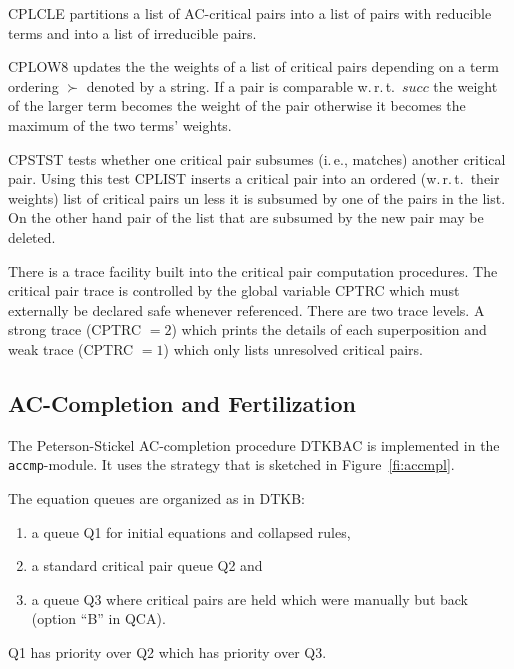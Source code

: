 CPLCLE partitions a list of AC-critical pairs into a list of pairs with 
reducible terms and into a list of irreducible pairs.

CPLOW8 updates the the weights of a list of critical pairs depending
on a term ordering $\succ$ denoted by a string.
If a pair is comparable w.\,r.\,t.\ $succ$ the weight of the larger
term becomes the weight of the pair otherwise it becomes the maximum of the
two terms' weights.

CPSTST tests whether one critical pair subsumes (i.\,e., matches)
another critical pair.
Using this test CPLIST inserts a critical pair into an 
ordered (w.\,r.\,t.\ their weights) list of critical pairs un less it is
subsumed by one of the pairs in the list.
On the other hand pair of the list that are subsumed by the new pair
may be deleted.

There is a trace facility built into the critical pair computation
procedures.
The critical pair trace is controlled by the global variable CPTRC
which must externally be declared safe whenever referenced.
There are two trace levels.
A strong trace (CPTRC $= 2$) which prints the details of each superposition 
and weak trace (CPTRC $= 1$) which only lists unresolved critical pairs.

\subsection{AC-Completion and Fertilization}

The Peterson-Stickel AC-completion procedure DTKBAC is implemented in the
{\tt accmp}-module.
It uses  the strategy that is sketched in
Figure~\ref{fi:accmpl}.

The equation queues are organized as in DTKB:
\begin{enumerate}
 \item a queue Q1 for initial equations and collapsed rules,
 \item a standard critical pair queue Q2 and
 \item a queue Q3 where critical pairs are held which
    were manually but back (option ``B'' in QCA).
\end{enumerate}
Q1 has priority over Q2 which has priority over Q3.

